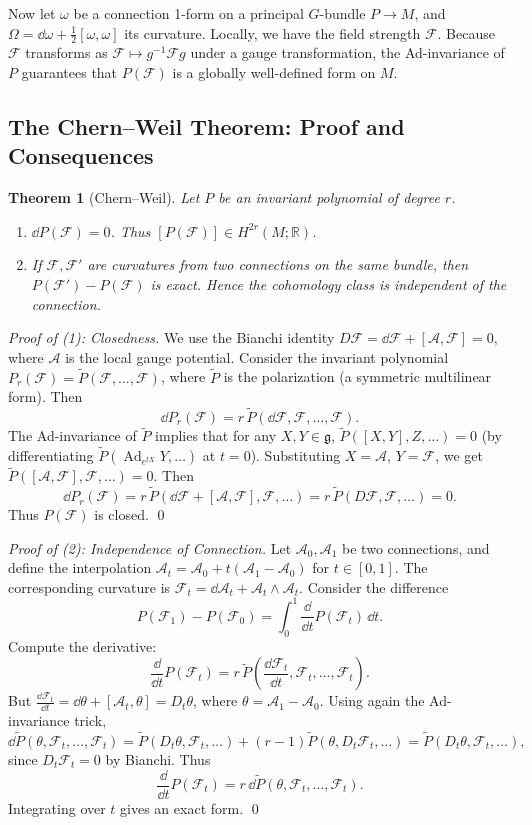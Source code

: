 \documentclass[11pt]{article}
\newcommand{\Ad}{\operatorname{Ad}}    %
\newcommand{\cA}{\mathcal{A}}
\newcommand{\cF}{\mathcal{F}}
\newcommand{\g}{\mathfrak{g}}
\newcommand{\R}{\mathbb{R}}
\newtheorem{theorem}{Theorem}[section]
\begin{document}
Now let \(\omega\) be a connection 1-form on a principal \(G\)-bundle \(P\to M\), and \(\Omega = \dd\omega + \frac{1}{2}[\omega,\omega]\) its curvature. Locally, we have the field strength \(\cF\). Because \(\cF\) transforms as \(\cF \mapsto g^{-1}\cF g\) under a gauge transformation, the Ad-invariance of \(P\) guarantees that \(P(\cF)\) is a globally well-defined form on \(M\).

\subsection{The Chern--Weil Theorem: Proof and Consequences}
\begin{theorem}[Chern--Weil]
Let \(P\) be an invariant polynomial of degree \(r\).
\begin{enumerate}
    \item \(\dd P(\cF) = 0\). Thus \([P(\cF)]\in H^{2r}(M;\R)\).
    \item If \(\cF, \cF'\) are curvatures from two connections on the same bundle, then \(P(\cF')-P(\cF)\) is exact. Hence the cohomology class is independent of the connection.
\end{enumerate}
\end{theorem}

\begin{proof}[Proof of (1): Closedness]
We use the Bianchi identity \(D\cF = \dd\cF + [\cA,\cF] = 0\), where \(\cA\) is the local gauge potential. Consider the invariant polynomial \(P_r(\cF) = \tilde{P}(\cF,\dots,\cF)\), where \(\tilde{P}\) is the polarization (a symmetric multilinear form). Then
\[
\dd P_r(\cF) = r\, \tilde{P}(\dd\cF,\cF,\dots,\cF).
\]
The Ad-invariance of \(\tilde{P}\) implies that for any \(X,Y\in\g\), \(\tilde{P}([X,Y],Z,\dots) = 0\) (by differentiating \(\tilde{P}(\Ad_{e^{tX}}Y,\dots)\) at \(t=0\)). Substituting \(X=\cA\), \(Y=\cF\), we get \(\tilde{P}([\cA,\cF],\cF,\dots)=0\). Then
\[
\dd P_r(\cF) = r\, \tilde{P}(\dd\cF + [\cA,\cF], \cF,\dots) = r\, \tilde{P}(D\cF,\cF,\dots) = 0.
\]
Thus \(P(\cF)\) is closed. \qed
\end{proof}

\begin{proof}[Proof of (2): Independence of Connection]
Let \(\cA_0,\cA_1\) be two connections, and define the interpolation \(\cA_t = \cA_0 + t(\cA_1-\cA_0)\) for \(t\in[0,1]\). The corresponding curvature is \(\cF_t = \dd\cA_t + \cA_t\wedge\cA_t\). Consider the difference
\[
P(\cF_1) - P(\cF_0) = \int_0^1 \frac{\dd}{\dd t} P(\cF_t)\, \dd t.
\]
Compute the derivative:
\[
\frac{\dd}{\dd t} P(\cF_t) = r\, \tilde{P}\!\left(\frac{\dd\cF_t}{\dd t}, \cF_t, \dots, \cF_t\right).
\]
But \(\frac{\dd\cF_t}{\dd t} = \dd\theta + [\cA_t,\theta] = D_t\theta\), where \(\theta = \cA_1-\cA_0\). Using again the Ad-invariance trick,
\[
\dd \tilde{P}(\theta, \cF_t, \dots, \cF_t) = \tilde{P}(D_t\theta, \cF_t, \dots) + (r-1)\tilde{P}(\theta, D_t\cF_t, \dots) = \tilde{P}(D_t\theta, \cF_t, \dots),
\]
since \(D_t\cF_t = 0\) by Bianchi. Thus
\[
\frac{\dd}{\dd t} P(\cF_t) = r\, \dd \tilde{P}(\theta, \cF_t, \dots, \cF_t).
\]
Integrating over \(t\) gives an exact form. \qed
\end{proof}
\end{document}
